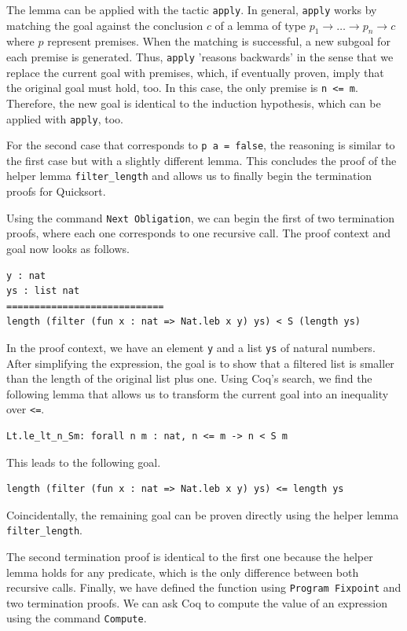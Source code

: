 \documentclass[a4paper, 11pt, fleqn, twoside, abstract=on]{scrreprt}
\newcommand{\cinl}[1]{\texttt{#1}}
\begin{document}
The lemma can be applied with the tactic \cinl{apply}.
In general, \cinl{apply} works by matching the goal against the conclusion $c$ of a lemma of type $p_1 \rightarrow \dots \rightarrow p_n \rightarrow c$ where $p$ represent premises.
When the matching is successful, a new subgoal for each premise is generated.
Thus, \cinl{apply} 'reasons backwards' in the sense that we replace the current goal with premises, which, if eventually proven, imply that the original goal must hold, too. 
In this case, the only premise is \cinl{n <= m}.
Therefore, the new goal is identical to the induction hypothesis, which can be applied with \cinl{apply}, too.

For the second case that corresponds to \cinl{p a = false}, the reasoning is similar to the first case but with a slightly different lemma.
This concludes the proof of the helper lemma \cinl{filter_length} and allows us to finally begin the termination proofs for Quicksort.

Using the command \cinl{Next Obligation}, we can begin the first of two termination proofs, where each one corresponds to one recursive call.
The proof context and goal now looks as follows.

\begin{verbatim}
y : nat
ys : list nat
============================
length (filter (fun x : nat => Nat.leb x y) ys) < S (length ys)
\end{verbatim}

In the proof context, we have an element \cinl{y} and a list \cinl{ys} of natural numbers.
After simplifying the expression, the goal is to show that a filtered list is smaller than the length of the original list plus one.
Using Coq's search, we find the following lemma that allows us to transform the current goal into an inequality over \cinl{<=}.

\begin{verbatim}
Lt.le_lt_n_Sm: forall n m : nat, n <= m -> n < S m
\end{verbatim}

This leads to the following goal.

\begin{verbatim}
length (filter (fun x : nat => Nat.leb x y) ys) <= length ys
\end{verbatim}

Coincidentally, the remaining goal can be proven directly using the helper lemma \cinl{filter_length}.

The second termination proof is identical to the first one because the helper lemma holds for any predicate, which is the only difference between both recursive calls.
Finally, we have defined the function using \cinl{Program Fixpoint} and two termination proofs.
We can ask Coq to compute the value of an expression using the command \cinl{Compute}.
\end{document}
